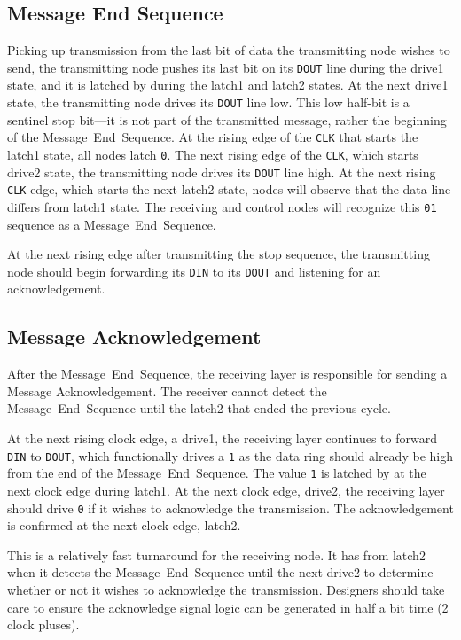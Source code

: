 \subsection{Message End Sequence}
\label{sec:protocol-end}
Picking up transmission from the last bit of data the transmitting node wishes
to send, the transmitting node pushes its last bit on its {\tt DOUT} line
during the {\sc drive1} state, and it is latched by \bus during the {\sc
latch1} and {\sc latch2} states.  At the next {\sc drive1} state, the 
transmitting node drives its {\tt DOUT} line low. This low half-bit is a sentinel 
stop bit---it is not part of the transmitted message, rather the beginning of 
the Message~End~Sequence. At the rising edge of the {\tt CLK} that starts the
{\sc latch1} state, all \bus nodes latch {\tt 0}. The next rising edge of the
{\tt CLK}, which starts {\sc drive2} state, the transmitting node drives its 
{\tt DOUT} line high. At the next rising {\tt CLK} edge, which starts the next 
{\sc latch2} state, nodes will observe that the data line differs from 
{\sc latch1} state. The receiving and control nodes will recognize this
{\tt 01} sequence as a Message~End~Sequence.

At the next rising edge after transmitting the stop sequence, the transmitting
node should begin forwarding its {\tt DIN} to its {\tt DOUT} and listening for
an acknowledgement.

\subsection{Message Acknowledgement}
\label{sec:protocol-ack}
After the Message~End~Sequence, the receiving layer is responsible for sending a
Message Acknowledgement. The receiver cannot detect the Message~End~Sequence
until the {\sc latch2} that ended the previous cycle.

At the next rising clock edge, a {\sc drive1}, the receiving layer continues
to forward {\tt DIN} to {\tt DOUT}, which functionally drives a {\tt 1} as the
data ring should already be high from the end of the Message~End~Sequence. The
value {\tt 1} is latched by \bus at the next clock edge during {\sc latch1}.
At the next clock edge, {\sc drive2}, the receiving layer should drive {\tt 0}
if it wishes to acknowledge the transmission. The acknowledgement is confirmed
at the next clock edge, {\sc latch2}.

This is a relatively fast turnaround for the receiving node. It has from {\sc
latch2} when it detects the Message~End~Sequence until the next {\sc drive2} to
determine whether or not it wishes to acknowledge the transmission. Designers
should take care to ensure the acknowledge signal logic can be generated in
half a bit time (2 clock pluses).


